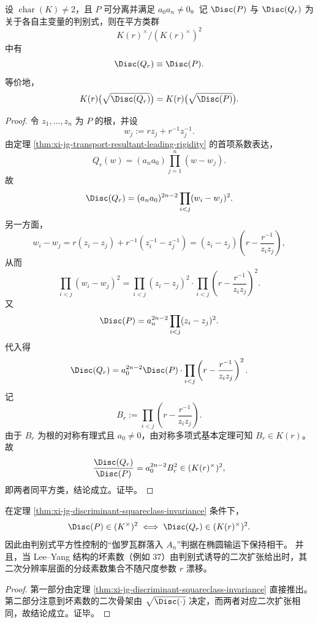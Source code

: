 \begin{theorem}[判别式平方类守恒]\label{thm:xi-jg-discriminant-squareclass-invariance}
设 \(\operatorname{char}(K)\neq 2\)，且 \(P\) 可分离并满足 \(a_0 a_n\neq 0\)。记 \(\Disc(P)\) 与 \(\Disc(Q_r)\) 为关于各自主变量的判别式，则在平方类群
\[
K(r)^\times/(K(r)^\times)^2
\]
中有
\[
\Disc(Q_r)\equiv \Disc(P).
\]
等价地，
\[
K(r)\bigl(\sqrt{\Disc(Q_r)}\bigr)=K(r)\bigl(\sqrt{\Disc(P)}\bigr).
\]
\end{theorem}
\begin{proof}
令 \(z_1,\dots,z_n\) 为 \(P\) 的根，并设
\[
w_j:=r z_j+r^{-1}z_j^{-1}.
\]
由定理 \ref{thm:xi-jg-transport-resultant-leading-rigidity} 的首项系数表达，
\[
Q_r(w)=(a_n a_0)\prod_{j=1}^n (w-w_j).
\]
故
\[
\Disc(Q_r)=(a_n a_0)^{2n-2}\prod_{i<j}(w_i-w_j)^2.
\]
另一方面，
\[
w_i-w_j
=r(z_i-z_j)+r^{-1}(z_i^{-1}-z_j^{-1})
=(z_i-z_j)\!\left(r-\frac{r^{-1}}{z_i z_j}\right),
\]
从而
\[
\prod_{i<j}(w_i-w_j)^2
=\prod_{i<j}(z_i-z_j)^2
\cdot
\prod_{i<j}\left(r-\frac{r^{-1}}{z_i z_j}\right)^2.
\]
又
\[
\Disc(P)=a_n^{2n-2}\prod_{i<j}(z_i-z_j)^2.
\]
代入得
\[
\Disc(Q_r)
=a_0^{2n-2}\Disc(P)\cdot
\prod_{i<j}\left(r-\frac{r^{-1}}{z_i z_j}\right)^2.
\]
记
\[
B_r:=\prod_{i<j}\left(r-\frac{r^{-1}}{z_i z_j}\right).
\]
由于 \(B_r\) 为根的对称有理式且 \(a_0\neq 0\)，由对称多项式基本定理可知 \(B_r\in K(r)\)。故
\[
\frac{\Disc(Q_r)}{\Disc(P)}=a_0^{2n-2}B_r^2\in (K(r)^\times)^2,
\]
即两者同平方类，结论成立。证毕。
\end{proof}

\begin{corollary}\label{cor:xi-jg-leyang-bad-prime-rigidity}
在定理 \ref{thm:xi-jg-discriminant-squareclass-invariance} 条件下，
\[
\Disc(P)\in (K^\times)^2
\iff
\Disc(Q_r)\in (K(r)^\times)^2.
\]
因此由判别式平方性控制的“伽罗瓦群落入 \(A_n\)”判据在椭圆输运下保持相干。
并且，当 Lee--Yang 结构的坏素数（例如 \(37\)）由判别式诱导的二次扩张给出时，其二次分辨率层面的分歧素数集合不随尺度参数 \(r\) 漂移。
\end{corollary}
\begin{proof}
第一部分由定理 \ref{thm:xi-jg-discriminant-squareclass-invariance} 直接推出。
第二部分注意到坏素数的二次骨架由 \(\sqrt{\Disc(\cdot)}\) 决定，而两者对应二次扩张相同，故结论成立。证毕。
\end{proof}


